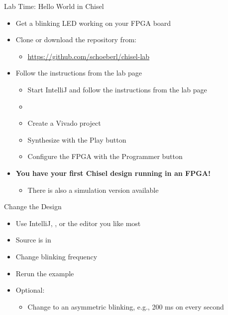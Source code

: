 \begin{frame}[fragile]{Lab Time: Hello World in Chisel}
\begin{itemize}
\item Get a blinking LED working on your FPGA board
\item Clone or download the repository from:
\begin{itemize}
\item \url{https://github.com/schoeberl/chisel-lab}
\end{itemize}
\item Follow the instructions from the lab page
\begin{itemize}
\item Start IntelliJ and follow the instructions from the lab page
\item {}
\item Create a Vivado project
\item Synthesize with the Play button
\item Configure the FPGA with the Programmer button
\end{itemize}
\item {\bf You have your first Chisel design running in an FPGA!}
\begin{itemize}
\item There is also a simulation version available
\end{itemize}
\end{itemize}
\end{frame}



\begin{frame}[fragile]{Change the Design}
\begin{itemize}
\item Use IntelliJ, , or the editor you like most
\item Source is in 
\item Change blinking frequency
\item Rerun the example
\item Optional:
\begin{itemize}
\item Change to an asymmetric blinking, e.g., 200 ms on every second 
\end{itemize}
\end{itemize}
\end{frame}


